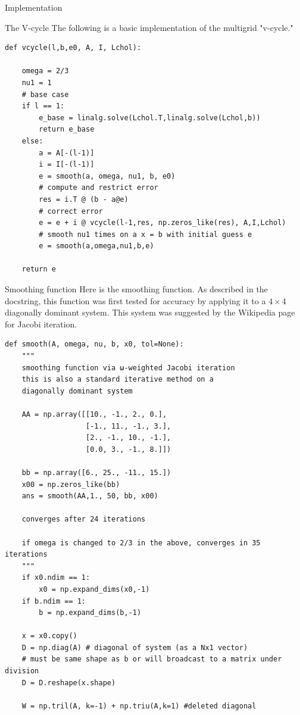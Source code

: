 \documentclass[10pt]{article}
\theoremstyle{definition}
\begin{document}
\begin{section}{Implementation}
\begin{subsection}{The V-cycle}
The following is a basic implementation of the multigrid "v-cycle." 
\begin{lstlisting}
def vcycle(l,b,e0, A, I, Lchol):
    
    omega = 2/3
    nu1 = 1
    # base case
    if l == 1:
        e_base = linalg.solve(Lchol.T,linalg.solve(Lchol,b))
        return e_base
    else:
        a = A[-(l-1)]
        i = I[-(l-1)]
        e = smooth(a, omega, nu1, b, e0)
        # compute and restrict error
        res = i.T @ (b - a@e)
        # correct error
        e = e + i @ vcycle(l-1,res, np.zeros_like(res), A,I,Lchol)
        # smooth nu1 times on a x = b with initial guess e
        e = smooth(a,omega,nu1,b,e)

    return e
\end{lstlisting}
\end{subsection}
\begin{subsection}{Smoothing function}
Here is the smoothing function. As described in the docstring,
this function was first tested for accuracy by applying it to a
$4\times4$ diagonally dominant system. This system was suggested
by the Wikipedia page for Jacobi iteration.

\begin{lstlisting}
def smooth(A, omega, nu, b, x0, tol=None):
    """
    smoothing function via ω-weighted Jacobi iteration
    this is also a standard iterative method on a
    diagonally dominant system

    AA = np.array([[10., -1., 2., 0.],
                   [-1., 11., -1., 3.],
                   [2., -1., 10., -1.],
                   [0.0, 3., -1., 8.]])

    bb = np.array([6., 25., -11., 15.])
    x00 = np.zeros_like(bb)
    ans = smooth(AA,1., 50, bb, x00)

    converges after 24 iterations
    
    if omega is changed to 2/3 in the above, converges in 35 iterations
    """
    if x0.ndim == 1:
        x0 = np.expand_dims(x0,-1)
    if b.ndim == 1:
        b = np.expand_dims(b,-1)
    
    x = x0.copy()
    D = np.diag(A) # diagonal of system (as a Nx1 vector)
    # must be same shape as b or will broadcast to a matrix under division
    D = D.reshape(x.shape)

    W = np.tril(A, k=-1) + np.triu(A,k=1) #deleted diagonal


\end{lstlisting}
\end{subsection}
\end{section}
\end{document}
